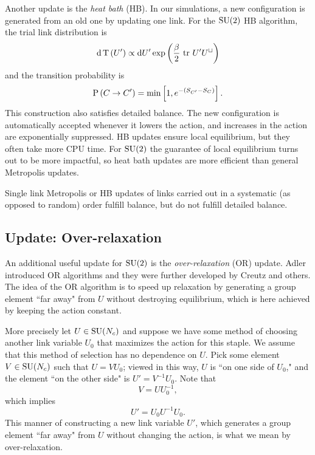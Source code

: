 Another update is the {\it heat bath} (HB). In our
simulations, a new configuration is generated from an old one by updating one
link. For the $\operatorname{SU}(2)$ HB algorithm, the trial link distribution is
\begin{equation}\label{eq:PTdist}
  \dd{\operatorname{T}\left(U'\right)}\propto \dd U'\exp\left(\frac{\beta}{2}\,\tr\,
  U'U^\sqcup\right)
\end{equation}
and the transition probability is
\begin{equation}
  \operatorname{P}\left(C\to C'\right)=\min\left[1,e^{-(S_{C'}-S_C)}\right].
\end{equation}
This construction also satisfies detailed balance. The new configuration 
is automatically accepted whenever it lowers the action, and
increases in the action are exponentially suppressed.
HB updates ensure local equilibrium, but they often 
take more CPU time. For $\operatorname{SU}(2)$ the guarantee of local equilibrium
turns out to be more impactful, so heat bath updates are more efficient
than general Metropolis updates.

Single link Metropolis or HB updates of links carried out in a systematic 
(as opposed to random) order fulfill balance, but do not
fulfill detailed balance.

\subsection{Update: Over-relaxation}

An additional useful update for $\operatorname{SU}(2)$ is the 
{\it over-relaxation} (OR) update. 
Adler introduced OR algorithms \cite{adler_over-relaxation_1981} and 
they were further developed by Creutz \cite{creutz_overrelaxation_1987} 
and others. The idea of the OR algorithm is to speed up relaxation 
by generating a group element ``far away" from $U$ without
destroying equilibrium, which is here achieved by keeping the action constant.

More precisely let $U\in\operatorname{SU}(N_c)$ and suppose we have some method of
choosing another link variable $U_0$ that maximizes
the action for this staple.  We assume that this method of selection has no
dependence on $U$.  Pick some element $V\in\operatorname{SU}(N_c)$ such that $U=VU_0$; viewed
in this way, $U$ is ``on one side of $U_0$," and the element 
``on the other side" is $U'=V^{-1}U_0$.  Note that
\begin{equation}
  V=U U_0^{-1},
\end{equation}
which implies
\begin{equation}
  U' = U_0 U^{-1} U_0.
\end{equation}
This manner of constructing a new link variable $U'$, which generates
a group element ``far away" from $U$ without changing the action, 
is what we mean by over-relaxation.

